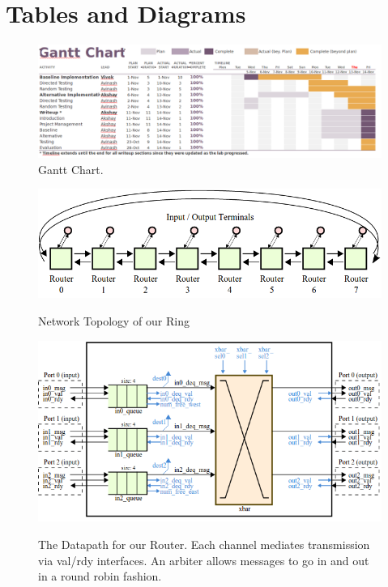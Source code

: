 \documentclass[10pt]{article}
\begin{document}
\newpage
\section {Tables and Diagrams}


\begin{figure}[h]
	\centering
	\includegraphics[scale=0.4, angle=90]{gantt}
	\caption{Gantt Chart.}
	\label{fig:gantt}
\end{figure}

\begin{figure}[h]
	\centering
	\includegraphics[scale=0.5]{topology}
	\label{fig:topo}
	\caption{Network Topology of our Ring}
\end{figure}

\begin{figure}[h]
	\centering
	\includegraphics[scale=0.7]{dpath}
	\label{fig:dpath}
	\caption
	{
		The Datapath for our Router.
		Each channel mediates transmission via val/rdy interfaces.
		An arbiter allows messages to go in and out in a round robin fashion.
	}
\end{figure}
\end{document}
